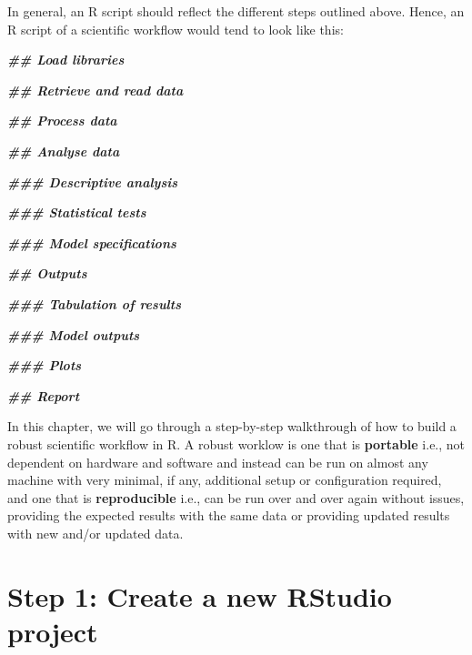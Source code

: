 \documentclass[
  12pt,
]{book}
\newenvironment{Shaded}{\begin{snugshade}}{\end{snugshade}}
\newcommand{\DocumentationTok}[1]{\textcolor[rgb]{0.56,0.35,0.01}{\textbf{\textit{#1}}}}
\begin{document}
In general, an R script should reflect the different steps outlined above. Hence, an R script of a scientific workflow would tend to look like this:

\begin{Shaded}
\begin{Highlighting}[]
\DocumentationTok{\#\# Load libraries}


\DocumentationTok{\#\# Retrieve and read data}


\DocumentationTok{\#\# Process data}


\DocumentationTok{\#\# Analyse data}

\DocumentationTok{\#\#\# Descriptive analysis}

\DocumentationTok{\#\#\# Statistical tests}

\DocumentationTok{\#\#\# Model specifications}


\DocumentationTok{\#\# Outputs}

\DocumentationTok{\#\#\# Tabulation of results}

\DocumentationTok{\#\#\# Model outputs}

\DocumentationTok{\#\#\# Plots}


\DocumentationTok{\#\# Report}

\end{Highlighting}
\end{Shaded}

In this chapter, we will go through a step-by-step walkthrough of how to build a robust scientific workflow in R. A robust worklow is one that is \textbf{portable} i.e., not dependent on hardware and software and instead can be run on almost any machine with very minimal, if any, additional setup or configuration required, and one that is \textbf{reproducible} i.e., can be run over and over again without issues, providing the expected results with the same data or providing updated results with new and/or updated data.

\hypertarget{step-1-create-a-new-rstudio-project}{%
\section{Step 1: Create a new RStudio project}\label{step-1-create-a-new-rstudio-project}}
\end{document}

